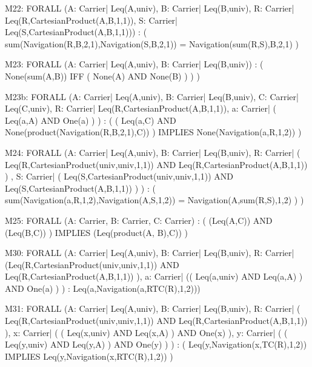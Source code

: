 \begin{verbnobox}[\tiny]
M22:
	FORALL (A: Carrier| Leq(A,univ), 
		   B: Carrier| Leq(B,univ), 
		   R: Carrier| Leq(R,CartesianProduct(A,B,1,1)), 
		   S: Carrier| Leq(S,CartesianProduct(A,B,1,1))) : 
	  ( sum(Navigation(R,B,2,1),Navigation(S,B,2,1)) = Navigation(sum(R,S),B,2,1) )
\end{verbnobox}

\begin{verbnobox}[\tiny]
M23:
	FORALL (A: Carrier| Leq(A,univ), B: Carrier| Leq(B,univ)) :
		( None(sum(A,B)) IFF  ( None(A) AND None(B) )  ) )
\end{verbnobox}

\begin{verbnobox}[\tiny]
M23b:
	FORALL (A: Carrier| Leq(A,univ), 
		   B: Carrier| Leq(B,univ), 
		   C: Carrier| Leq(C,univ), 
		   R: Carrier| Leq(R,CartesianProduct(A,B,1,1)), 
		   a: Carrier|  ( Leq(a,A) AND One(a) ) ) :
	 ( ( Leq(a,C) AND None(product(Navigation(R,B,2,1),C)) ) IMPLIES None(Navigation(a,R,1,2)) )
\end{verbnobox}

\begin{verbnobox}[\tiny]
M24:
	FORALL (A: Carrier| Leq(A,univ), 
		   B: Carrier| Leq(B,univ), 
		   R: Carrier| ( Leq(R,CartesianProduct(univ,univ,1,1)) AND Leq(R,CartesianProduct(A,B,1,1)) ) , 
		   S: Carrier|  ( Leq(S,CartesianProduct(univ,univ,1,1)) AND Leq(S,CartesianProduct(A,B,1,1)) ) ) :
		( sum(Navigation(a,R,1,2),Navigation(A,S,1,2)) = Navigation(A,sum(R,S),1,2) ) )
\end{verbnobox}

\begin{verbnobox}[\tiny]
M25:
	FORALL (A: Carrier, B: Carrier, C: Carrier) :  
			( (Leq(A,C)) AND (Leq(B,C)) )  IMPLIES (Leq(product(A, B),C)) )
\end{verbnobox}

\begin{verbnobox}[\tiny]
M30:
	FORALL (A: Carrier| Leq(A,univ), 
		   B: Carrier| Leq(B,univ), 
		   R: Carrier| (Leq(R,CartesianProduct(univ,univ,1,1)) AND Leq(R,CartesianProduct(A,B,1,1)) ), 
		   a: Carrier| (( Leq(a,univ) AND Leq(a,A) )  AND One(a) ) ) : 
	  Leq(a,Navigation(a,RTC(R),1,2)))
\end{verbnobox}

\begin{verbnobox}[\tiny]
M31:
	FORALL (A: Carrier| Leq(A,univ), 
		   B: Carrier| Leq(B,univ), 
		   R: Carrier|  ( Leq(R,CartesianProduct(univ,univ,1,1)) AND Leq(R,CartesianProduct(A,B,1,1)) ),
		   x: Carrier|  (  ( Leq(x,univ) AND Leq(x,A) )  AND One(x) ),
		   y: Carrier|  (  ( Leq(y,univ) AND Leq(y,A) )  AND One(y) ) ) : 
	  ( Leq(y,Navigation(x,TC(R),1,2)) IMPLIES Leq(y,Navigation(x,RTC(R),1,2)) )
\end{verbnobox}

